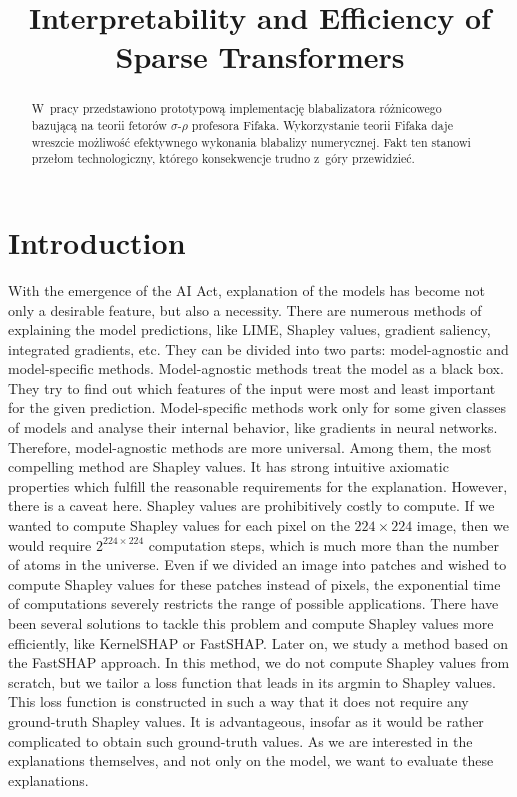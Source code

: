 \documentclass[magisterska,en]{pracamgr}
\title{Interpretability and Efficiency of Sparse Transformers}
\begin{document}
\maketitle

\begin{abstract}
  W~pracy przedstawiono prototypową implementację blabalizatora
  różnicowego bazującą na teorii fetorów $\sigma$-$\rho$ profesora
  Fifaka.  Wykorzystanie teorii Fifaka daje wreszcie możliwość
  efektywnego wykonania blabalizy numerycznej.  Fakt ten stanowi
  przełom technologiczny, którego konsekwencje trudno z~góry
  przewidzieć.
\end{abstract}

\tableofcontents

\chapter*{Introduction}
With the emergence of the AI Act, explanation of the models has become not only a desirable feature, but also a necessity. There are numerous methods of explaining the model predictions, like LIME, Shapley values, gradient saliency, integrated gradients, etc. They can be 	divided into two parts: model-agnostic and model-specific methods. Model-agnostic methods treat the model as a black box. They try to find out which features of the input were most and least important for the given prediction. Model-specific methods work only for some given classes of models and analyse their internal behavior, like gradients in neural networks.
Therefore, model-agnostic methods are more universal. Among them, the most compelling method are Shapley values. It has strong intuitive axiomatic properties which fulfill the reasonable requirements for the explanation. However, there is a caveat here. Shapley values are prohibitively costly to compute. If we wanted to compute Shapley values for each pixel on the $224 \times 224$ image, then we would require $2^{224\times 224}$ computation steps, which is much more than the number of atoms in the universe. Even if we divided an image into patches and wished to compute Shapley values for these patches instead of pixels, the exponential time of computations severely restricts the range of possible applications.
There have been several solutions to tackle this problem and compute Shapley values more efficiently, like KernelSHAP or FastSHAP. Later on, we study a method based on the FastSHAP approach. In this method, we do not compute Shapley values from scratch, but we tailor a loss function that leads in its argmin to Shapley values. This loss function is constructed in such a way that it does not require any ground-truth Shapley values. It is advantageous, insofar as it would be rather complicated to obtain such ground-truth values. As we are interested in the explanations themselves, and not only on the model, we want to evaluate these explanations. 
\end{document}

